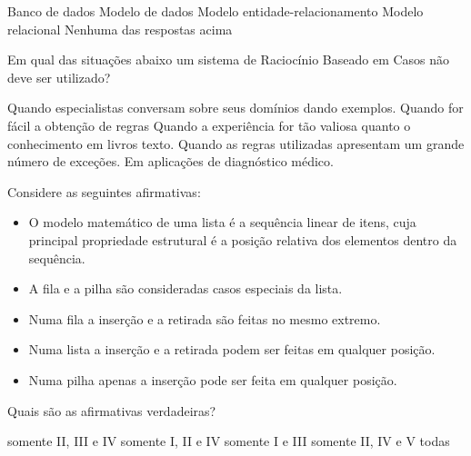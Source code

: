 \documentclass[12pt, addpoints]{exam}
\begin{document}
\begin{questions}
\begin{choices}
\choice Banco de dados
\choice Modelo de dados
\choice Modelo entidade-relacionamento
\choice Modelo relacional
\choice Nenhuma das respostas acima
\end{choices}

\question

Em qual das situações abaixo um sistema de Raciocínio Baseado em Casos não deve ser utilizado?


\begin{choices}
\choice Quando especialistas conversam sobre seus domínios dando exemplos.
\choice Quando for fácil a obtenção de regras
\choice Quando a experiência for tão valiosa quanto o conhecimento em livros texto.
\choice Quando as regras utilizadas apresentam um grande número de exceções.
\choice Em aplicações de diagnóstico médico.
\end{choices}

\question

Considere as seguintes afirmativas:

\begin{itemize}

    \item O modelo matemático de uma lista é a sequência linear de itens, cuja principal propriedade estrutural é a posição relativa dos elementos dentro da sequência.

    \item A fila e a pilha são consideradas casos especiais da lista.

    \item Numa fila a inserção e a retirada são feitas no mesmo extremo.

    \item Numa lista a inserção e a retirada podem ser feitas em qualquer posição.

    \item Numa pilha apenas a inserção pode ser feita em qualquer posição.

\end{itemize}



Quais são as afirmativas verdadeiras?
\begin{choices}
\choice somente II, III e IV
\choice somente I, II e IV
\choice somente I e III
\choice somente II, IV e V
\choice todas
\end{choices}



    \end{questions}
    
\end{document}
